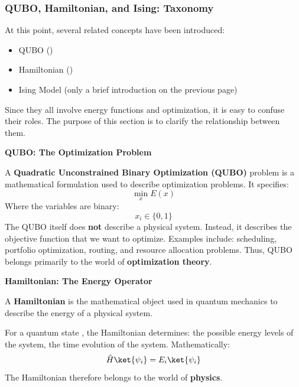 \subsubsection{QUBO, Hamiltonian, and Ising: Taxonomy}\label{sec:qubo-hamiltonian-ising-taxonomy}

At this point, several related concepts have been introduced:
\begin{itemize}
    \item QUBO ()
    \item Hamiltonian ()
    \item Ising Model (only a brief introduction on the previous page)
\end{itemize}
Since they all involve energy functions and optimization, it is easy to confuse their roles. The purpose of this section is to clarify the relationship between them.

\highspace
\begin{flushleft}
    \textcolor{Green3}{ \textbf{QUBO: The Optimization Problem}}
\end{flushleft}
A \textbf{Quadratic Unconstrained Binary Optimization (QUBO)} problem is a mathematical formulation used to describe optimization problems. It specifies:
\begin{equation*}
    \min_{x} E(x)
\end{equation*}
Where the variables are binary:
\begin{equation*}
    x_i \in \{0, 1\}
\end{equation*}
The QUBO itself does \textbf{not} describe a physical system. Instead, it describes the objective function that we want to optimize. Examples include: scheduling, portfolio optimization, routing, and resource allocation problems. Thus, QUBO belongs primarily to the world of \textbf{optimization theory}.

\highspace
\begin{flushleft}
    \textcolor{Green3}{ \textbf{Hamiltonian: The Energy Operator}}
\end{flushleft}
A \textbf{Hamiltonian} is the mathematical object used in quantum mechanics to describe the energy of a physical system.

\highspace
For a quantum state \ket{\psi}, the Hamiltonian determines: the possible energy levels of the system, the time evolution of the system. Mathematically:
\begin{equation*}
    \hat{H}\ket{\psi_{i}} = E_i \ket{\psi_{i}}
\end{equation*}
The Hamiltonian therefore belongs to the world of \textbf{physics}.

